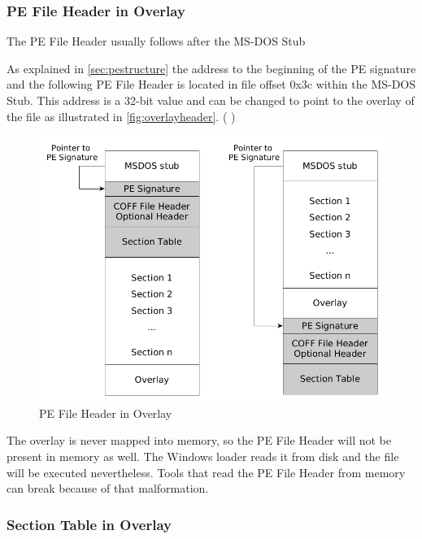 \subsubsection*{PE File Header in Overlay}

The PE File Header usually follows after the MS-DOS Stub 

As explained in \autoref{sec:pestructure} the address to the beginning of the PE signature and the following PE File Header is located in file offset 0x3c within the MS-DOS Stub. This address is a 32-bit value and can be changed to point to the overlay of the file as illustrated in \autoref{fig:overlayheader}. (\cf{} \cite[slide 13]{vuksan11})

\begin{figure}
\includegraphics[width=.98\textwidth, height=.60\textheight,keepaspectratio]{graphics/overlayheader}
\caption{PE File Header in Overlay }
\label{fig:overlayheader} 
\end{figure}

The overlay is never mapped into memory, so the PE File Header will not be present in memory as well. The Windows loader reads it from disk and the file will be executed nevertheless. Tools that read the PE File Header from memory can break because of that malformation.

\subsubsection*{Section Table in Overlay}

